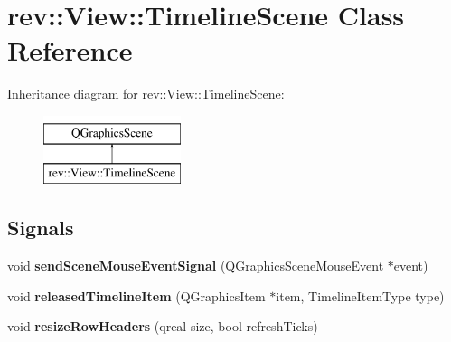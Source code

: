 \hypertarget{classrev_1_1_view_1_1_timeline_scene}{}\section{rev\+::View\+::Timeline\+Scene Class Reference}
\label{classrev_1_1_view_1_1_timeline_scene}
Inheritance diagram for rev\+::View\+::Timeline\+Scene\+:\begin{figure}[H]
\begin{center}
\leavevmode
\includegraphics[height=2.000000cm]{classrev_1_1_view_1_1_timeline_scene}
\end{center}
\end{figure}
\subsection*{Signals}
\begin{DoxyCompactItemize}
\item 
\mbox{\label{classrev_1_1_view_1_1_timeline_scene_a98908898ad5dd2136bf23456fe36806c}} 
void {\bfseries send\+Scene\+Mouse\+Event\+Signal} (Q\+Graphics\+Scene\+Mouse\+Event $\ast$event)
\item 
\mbox{\label{classrev_1_1_view_1_1_timeline_scene_aba45d0c1fbcc64041e1b0e43ea23a693}} 
void {\bfseries released\+Timeline\+Item} (Q\+Graphics\+Item $\ast$item, Timeline\+Item\+Type type)
\item 
\mbox{\label{classrev_1_1_view_1_1_timeline_scene_a1ad38f6c2c360feda5df2cf3e977b6f5}} 
void {\bfseries resize\+Row\+Headers} (qreal size, bool refresh\+Ticks)
\end{DoxyCompactItemize}
